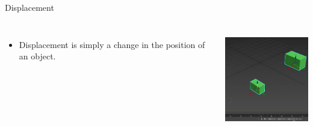 \documentclass[]{beamer}
\begin{document}
    \begin{frame}
      Displacement 
      \vspace{3 mm}
      
      
      
         \begin{columns}[c]
         \column{2in}  %
        
      
      
      \begin{itemize}
      \item Displacement is simply a change in the position of an object. 
      
      
      \end{itemize}
      
      
         \column{2in}
      
      
      
      
        \begin{center}
        \includegraphics[height=1.7in]{images/dis3d2.jpg}
      \end{center}
      
      
         \end{columns}
      
       \end{frame}
\end{document}
